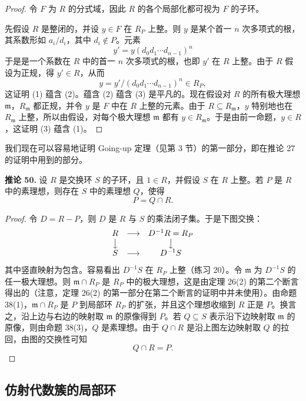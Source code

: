 \begin{proof}
	令 $F$ 为 $R$ 的分式域，因此 $R$ 的各个局部化都可视为 $F$ 的子环。
	
	先假设 $R$ 是整闭的，并设 $y\in F$ 在 $R_P$ 上整。则 $y$ 是某个首一 $n$ 次多项式的根，其系数形如 $a_i/d_i$，其中 $d_i\notin P$。元素
	\[
	y'=y(d_0d_1\cdots d_{n-1})^n
	\]
	于是是一个系数在 $R$ 中的首一 $n$ 次多项式的根，也即 $y'$ 在 $R$ 上整。由于 $R$ 假设为正规，得 $y'\in R$，从而
	\[
	y=y'/(d_0d_1\cdots d_{n-1})^n\in R_P,
	\]
	这证明 (1) 蕴含 (2)。蕴含 (2) 蕴含 (3) 是平凡的。现在假设对 $R$ 的所有极大理想 $\mathfrak m$，$R_{\mathfrak m}$ 都正规，并令 $y$ 是 $F$ 中在 $R$ 上整的元素。由于 $R\subseteq R_{\mathfrak m}$，$y$ 特别地也在 $R_{\mathfrak m}$ 上整，所以由假设，对每个极大理想 $\mathfrak m$ 都有 $y\in R_{\mathfrak m}$。于是由前一命题，$y\in R$，这证明 (3) 蕴含 (1)。
\end{proof}

我们现在可以容易地证明 Going-up 定理（见第 3 节）的第一部分，即在推论 27 的证明中用到的部分。

\noindent\textbf{推论 50.} 设 $R$ 是交换环 $S$ 的子环，且 $1\in R$，并假设 $S$ 在 $R$ 上整。若 $P$ 是 $R$ 中的素理想，则存在 $S$ 中的素理想 $Q$，使得
\[
P=Q\cap R.
\]

\begin{proof}
	令 $D=R-P$，则 $D$ 是 $R$ 与 $S$ 的乘法闭子集。于是下图交换：
	\[
	\begin{array}{ccc}
		R & \longrightarrow & D^{-1}R=R_P \\
		\big\downarrow & & \big\downarrow \\
		S & \longrightarrow & D^{-1}S
	\end{array}
	\]
	其中竖直映射为包含。容易看出 $D^{-1}S$ 在 $R_P$ 上整（练习 20）。令 $\mathfrak m$ 为 $D^{-1}S$ 的任一极大理想。则 $\mathfrak m\cap R_P$ 是 $R_P$ 中的极大理想，这是由定理 26(2) 的第二个断言得出的（注意，定理 26(2) 的第一部分在第二个断言的证明中并未使用）。由命题 38(1)，$\mathfrak m\cap R_P$ 是 $P$ 到局部环 $R_P$ 的扩张，并且这个理想收缩到 $R$ 正是 $P$。换言之，沿上边与右边的映射取 $\mathfrak m$ 的原像得到 $P$。若 $Q\subseteq S$ 表示沿下边映射取 $\mathfrak m$ 的原像，则由命题 38(3)，$Q$ 是素理想。由于 $Q\cap R$ 是沿上图左边映射取 $Q$ 的拉回，由图的交换性可知
	\[
	Q\cap R=P.
	\]
\end{proof}

\subsection*{仿射代数簇的局部环}

